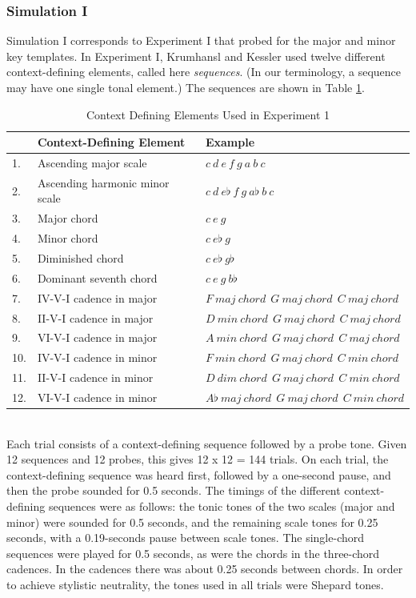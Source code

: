\subsubsection*{Simulation I}
Simulation I corresponds to Experiment I that probed for the
major and minor key templates. In Experiment I, Krumhansl and
Kessler used twelve different context-defining elements, called
here {\sl sequences}. (In our terminology, a sequence may have
one single tonal element.) The sequences are shown in Table
\ref{table_one}.
%
\begin{table}[!h]
\footnotesize
\begin{tabular}{lll}

&Context-Defining Element& Example \\ \hline 1. &Ascending major
scale & $c~d ~e~ f~ g ~a ~b ~c$ \\ 2. &Ascending harmonic minor
scale & $c~ d~ e\flat~ f~ g~ a\flat~ b~ c$ \\ 3. &Major chord &
$c~ e~ g$ \\ 4. &Minor chord & $c~ e\flat~ g$ \\ 5. &Diminished
chord & $c~ e\flat~ g\flat$ \\ 6. &Dominant seventh chord & $c~ e~
g~ b\flat$ \\ 7. &IV-V-I cadence in major & $F~ maj~ chord~~ G~
maj~ chord~~ C~ maj~ chord $ \\ 8. &II-V-I cadence in major & $D~
min~ chord~~ G ~maj~ chord ~~C ~maj ~chord $ \\ 9. &VI-V-I cadence
in major & $A ~min~ chord~~ G~ maj ~chord~~ C ~maj ~chord $ \\ 10.
&IV-V-I cadence in minor & $F~ min~ chord~~ G ~maj ~chord ~~C~ min
~chord $ \\ 11. &II-V-I cadence in minor & $D~ dim ~chord ~~G
~maj~ chord ~~C ~min~ chord $ \\ 12. &VI-V-I cadence in minor &
$A\flat~ maj ~chord ~~G ~maj ~chord ~~C~ min ~chord $ \\

\end{tabular}
\caption{Context Defining Elements Used in Experiment 1}
\label{table_one}
\end{table}\\

Each trial consists of a context-defining sequence followed by a
probe tone. Given 12 sequences and 12 probes, this gives 12 x 12 =
144 trials. On each trial, the context-defining sequence was heard
first, followed by a one-second pause, and then the probe sounded
for 0.5 seconds. The timings of the different context-defining
sequences were as follows: the tonic tones of the two scales
(major and minor) were sounded for 0.5 seconds, and the remaining
scale tones for 0.25 seconds, with a 0.19-seconds pause between
scale tones. The single-chord sequences were played for 0.5
seconds, as were the chords in the three-chord cadences. In the
cadences there was about 0.25 seconds between chords. In order to
achieve stylistic neutrality, the tones used in all trials were
Shepard tones.

